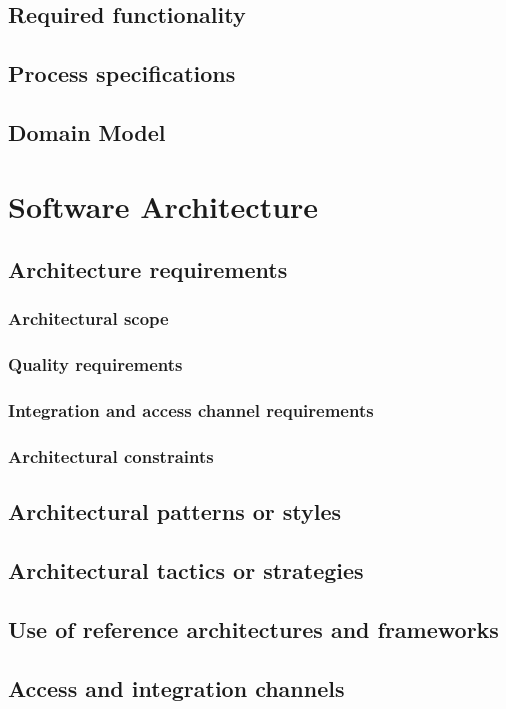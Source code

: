 \documentclass[a4paper,12pt]{report}
\begin{document}
	\subsection{Required functionality}
	\subsection{Process specifications}
	\subsection{Domain Model}
\section{Software Architecture}
	\subsection{Architecture requirements}
		\subsubsection{Architectural scope}
		\subsubsection{Quality requirements}
		\subsubsection{Integration and access channel requirements}
		\subsubsection{Architectural constraints}
	\subsection{Architectural patterns or styles}
	\subsection{Architectural tactics or strategies}
	\subsection{Use of reference architectures and frameworks}
	\subsection{Access and integration channels}
\end{document}
